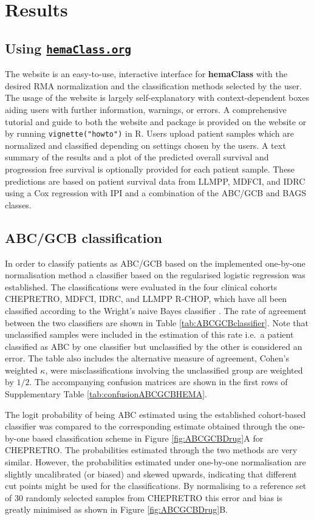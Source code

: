 \documentclass[twocolumn]{bmcart}%
\newcommand{\hemaClass}{\href{http://hemaClass.org}{\texttt{hemaClass.org}}}
\newcommand{\R}{\textsf{R}}
\newcommand{\pkg}[1]{\textbf{#1}}
\begin{document}
\section{Results}
\subsection{Using \hemaClass{}}
The website is an easy-to-use, interactive interface for \pkg{hemaClass} with the desired RMA normalization and the classification methods selected by the user.
The usage of the website is largely self-explanatory with context-dependent boxes aiding users with further information, warnings, or errors.
A comprehensive tutorial and guide to both the website and package is provided on the website or by running \texttt{vignette("howto")} in \R{}.
Users upload patient samples which are normalized and classified depending on settings chosen by the users.
A text summary of the results and a plot of the predicted overall survival and progression free survival is optionally provided for each patient sample.
These predictions are based on patient survival data from LLMPP, MDFCI, and IDRC using a Cox regression with IPI and a combination of the ABC/GCB and BAGS classes.



\subsection{ABC/GCB classification}
In order to classify patients as ABC/GCB based on the implemented one-by-one normalisation method a classifier based on the regularised logistic regression was established.
The classifications were evaluated in the four clinical cohorts CHEPRETRO, MDFCI, IDRC, and LLMPP R-CHOP, which have all been classified according to the Wright's naive Bayes classifier \cite{Wright2003,Lenz2008a}.
The rate of agreement between the two classifiers are shown in Table \ref{tab:ABCGCBclassifier}.
Note that unclassified samples were included in the estimation of this rate i.e.\ a patient classified as ABC by one classifier but unclassified by the other is considered an error.
The table also includes the alternative measure of agreement, Cohen's weighted $\kappa$, were misclassifications involving the unclassified group are weighted by $1/2$.
The accompanying confusion matrices are shown in the first rows of Supplementary Table \ref{tab:confusionABCGCBHEMA}.

The logit probability of being ABC estimated using the established cohort-based classifier was compared to the corresponding estimate obtained through the one-by-one based classification scheme in Figure \ref{fig:ABCGCBDrug}A for CHEPRETRO.
The probabilities estimated through the two methods are very similar.
However, the probabilities estimated under one-by-one normalisation are slightly uncalibrated (or biased) and skewed upwards, indicating that different cut points might be used for the classifications.
By normalising to a reference set of $30$ randomly selected samples from CHEPRETRO this error and bias is greatly minimised as shown in Figure \ref{fig:ABCGCBDrug}B.
\end{document}
